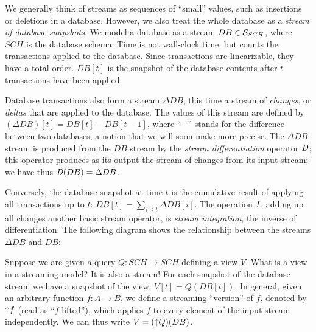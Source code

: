 \begin{center}
\end{center}

We generally think of streams as sequences of ``small'' values,
such as insertions or deletions in a database.
However, we also treat the whole database as a \emph{stream of database
snapshots}.  We model a database as a
stream $DB \in \mathcal{S}_{SCH}$, where $SCH$ is the database schema.
Time is not wall-clock time, but counts
the transactions applied to the database.
Since transactions are linearizable, they have a total order.
$DB[t]$ is the snapshot of the
database contents after $t$ transactions have been applied.

Database transactions also form a stream $\Delta DB$, this time a stream of \emph{changes},
or \emph{deltas} that are applied to the database.  The values of
this stream are defined by $(\Delta DB)[t] = DB[t] - DB[t-1]$, where ``$-$'' stands
for the difference between two databases, a notion that we will soon make more precise.
The $\Delta DB$ stream is produced from the $DB$ stream by
the \emph{stream differentiation} operator $\mathit{D}$;
this operator produces as its output the stream of changes from its input stream;
we have thus $\mathit{D}(DB) = \Delta DB$.

Conversely, the database snapshot at time $t$ is the cumulative result
of applying all transactions up to $t$: $DB[t] = \sum_{i \leq t}
\Delta DB[i]$.  The operation $\mathit{I}$, adding up all changes another
basic stream operator, is \emph{stream integration}, the inverse of
differentiation.  The following diagram shows the relationship
between the streams $\Delta DB$ and $DB$:
\begin{center}
\end{center}
Suppose we are given a query $Q : SCH \to SCH$ defining a view $V$.  What is
a view in a streaming model?  It is also a stream!  For each snapshot
of the database stream we have a snapshot of the view: $V[t] = Q(DB[t])$.
In general, given an arbitrary function $f: A \to B$, we define
a streaming ``version'' of $f$, denoted by ${\uparrow}f$
(read as ``$f$ lifted''), which applies
$f$ to every element of the input stream independently.
We can thus write $V = ({\uparrow}Q)(DB)$.

